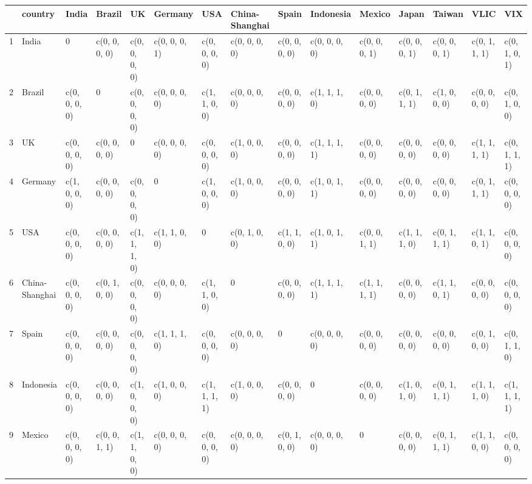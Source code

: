 \begin{table}[ht]
\centering
\begin{tabular}{lllllllllllllll}
  \hline
 & country & India & Brazil & UK & Germany & USA & China-Shanghai & Spain & Indonesia & Mexico & Japan & Taiwan & VLIC & VIX \\ 
  \hline
1 & India &             0 & c(0, 0, 0, 0) & c(0, 0, 0, 0) & c(0, 0, 0, 1) & c(0, 0, 0, 0) & c(0, 0, 0, 0) & c(0, 0, 0, 0) & c(0, 0, 0, 0) & c(0, 0, 0, 1) & c(0, 0, 0, 1) & c(0, 0, 0, 1) & c(0, 1, 1, 1) & c(0, 1, 0, 1) \\ 
  2 & Brazil & c(0, 0, 0, 0) &             0 & c(0, 0, 0, 0) & c(0, 0, 0, 0) & c(1, 1, 0, 0) & c(0, 0, 0, 0) & c(0, 0, 0, 0) & c(1, 1, 1, 0) & c(0, 0, 0, 0) & c(0, 1, 1, 1) & c(1, 0, 0, 0) & c(0, 0, 0, 0) & c(0, 1, 0, 0) \\ 
  3 & UK & c(0, 0, 0, 0) & c(0, 0, 0, 0) &             0 & c(0, 0, 0, 0) & c(0, 0, 0, 0) & c(1, 0, 0, 0) & c(0, 0, 0, 0) & c(1, 1, 1, 1) & c(0, 0, 0, 0) & c(0, 0, 0, 0) & c(0, 0, 0, 0) & c(1, 1, 1, 1) & c(0, 1, 1, 1) \\ 
  4 & Germany & c(1, 0, 0, 0) & c(0, 0, 0, 0) & c(0, 0, 0, 0) &             0 & c(1, 0, 0, 0) & c(1, 0, 0, 0) & c(0, 0, 0, 0) & c(1, 0, 1, 1) & c(0, 0, 0, 0) & c(0, 0, 0, 0) & c(0, 0, 0, 0) & c(0, 1, 1, 1) & c(0, 0, 0, 0) \\ 
  5 & USA & c(0, 0, 0, 0) & c(0, 0, 0, 0) & c(1, 1, 1, 0) & c(1, 1, 0, 0) &             0 & c(0, 1, 0, 0) & c(1, 1, 0, 0) & c(1, 0, 1, 1) & c(0, 0, 1, 1) & c(1, 1, 1, 0) & c(0, 1, 1, 1) & c(1, 1, 0, 1) & c(0, 0, 0, 0) \\ 
  6 & China-Shanghai & c(0, 0, 0, 0) & c(0, 1, 0, 0) & c(0, 0, 0, 0) & c(0, 0, 0, 0) & c(1, 1, 0, 0) &             0 & c(0, 0, 0, 0) & c(1, 1, 1, 1) & c(1, 1, 1, 1) & c(0, 0, 0, 0) & c(1, 1, 0, 1) & c(0, 0, 0, 0) & c(0, 0, 0, 0) \\ 
  7 & Spain & c(0, 0, 0, 0) & c(0, 0, 0, 0) & c(0, 0, 0, 0) & c(1, 1, 1, 0) & c(0, 0, 0, 0) & c(0, 0, 0, 0) &             0 & c(0, 0, 0, 0) & c(0, 0, 0, 0) & c(0, 0, 0, 0) & c(0, 0, 0, 0) & c(0, 1, 0, 0) & c(0, 1, 1, 0) \\ 
  8 & Indonesia & c(0, 0, 0, 0) & c(0, 0, 0, 0) & c(1, 0, 0, 0) & c(1, 0, 0, 0) & c(1, 1, 1, 1) & c(1, 0, 0, 0) & c(0, 0, 0, 0) &             0 & c(0, 0, 0, 0) & c(1, 0, 1, 0) & c(0, 1, 1, 1) & c(1, 1, 1, 0) & c(1, 1, 1, 1) \\ 
  9 & Mexico & c(0, 0, 0, 0) & c(0, 0, 1, 1) & c(1, 1, 0, 0) & c(0, 0, 0, 0) & c(0, 0, 0, 0) & c(0, 0, 0, 0) & c(0, 1, 0, 0) & c(0, 0, 0, 0) &             0 & c(0, 0, 0, 0) & c(0, 1, 1, 1) & c(1, 1, 0, 0) & c(0, 0, 0, 0) \\ 

\end{tabular}
\end{table}
